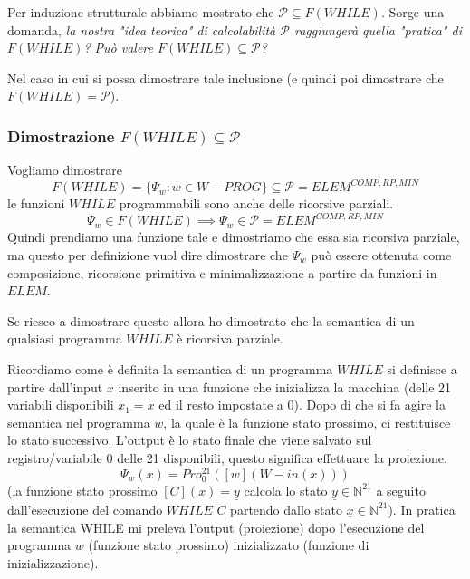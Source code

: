 \documentclass{article}
\begin{document}
Per induzione strutturale abbiamo mostrato che $\mathcal{P}\subseteq F(WHILE)$. Sorge una
domanda, \textit{la nostra "idea teorica" di calcolabilità $\mathcal{P}$ raggiungerà
    quella "pratica" di $F(WHILE)$? Può valere $F(WHILE)\subseteq\mathcal{P}$?}

Nel caso in cui si possa dimostrare tale inclusione (e quindi poi dimostrare che $F(WHILE)=\mathcal{P}$).

\subsubsection{Dimostrazione $F(WHILE)\subseteq\mathcal{P}$}
Vogliamo dimostrare
$$F(WHILE)=\{\Psi_w : w\in W-PROG\}\subseteq\mathcal{P}=ELEM^{COMP,RP,MIN}$$
le funzioni $WHILE$ programmabili sono anche delle ricorsive parziali.
$$\Psi_w\in F(WHILE)\implies\Psi_w\in\mathcal{P}=ELEM^{COMP,RP,MIN}$$
Quindi prendiamo una funzione tale e dimostriamo che essa sia ricorsiva parziale, ma questo
per definizione vuol dire dimostrare che $\Psi_w$ può essere ottenuta come composizione,
ricorsione primitiva e minimalizzazione a partire da funzioni in $ELEM$.

Se riesco a dimostrare questo allora ho dimostrato che la semantica di un qualsiasi programma
$WHILE$ è ricorsiva parziale.

Ricordiamo come è definita la semantica di un programma $WHILE$ si definisce a partire
dall'input $x$ inserito in una funzione che inizializza la macchina (delle 21 variabili
disponibili $x_1=x$ ed il resto impostate a 0). Dopo di che si fa agire la semantica nel
programma $w$, la quale è la funzione stato prossimo, ci restituisce lo stato successivo.
L'output è lo stato finale che viene salvato sul registro/variabile 0 delle 21 disponibili,
questo significa effettuare la proiezione.
$$\Psi_w(x)=Pro_0^{21}([w](W-in(x)))$$
(la funzione stato prossimo $[C](\underline{x})=\underline{y}$ calcola lo stato
$\underline{y}\in\mathbb{N}^{21}$ a seguito dall'esecuzione del comando $WHILE$ $C$
partendo dallo stato $\underline{x}\in\mathbb{N}^{21}$). In pratica la semantica
WHILE mi preleva l'output (proiezione) dopo l'esecuzione del programma $w$ (funzione
stato prossimo) inizializzato (funzione di inizializzazione).
\end{document}
